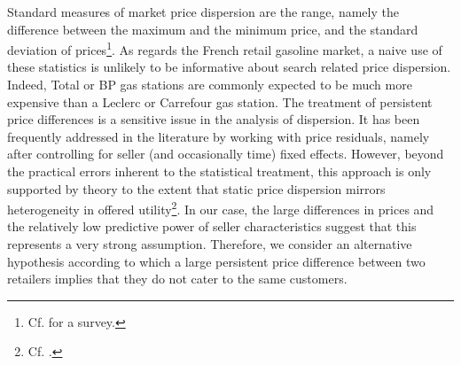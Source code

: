 \documentclass[english]{article}
\begin{document}
Standard measures of market price dispersion are the range, namely the difference between the maximum and the minimum price, and the standard deviation of prices\footnote{Cf. \cite{BAY06} for a survey.}. As regards the French retail gasoline market, a naive use of these statistics is unlikely to be informative about search related price dispersion. Indeed, Total or BP gas stations are commonly expected to be much more expensive than a Leclerc or Carrefour gas station. The treatment of persistent price differences is a sensitive issue in the analysis of dispersion. It has been frequently addressed in the literature by working with price residuals, namely after controlling for seller (and occasionally time) fixed effects. However, beyond the practical errors inherent to the statistical treatment, this approach is only supported by theory to the extent that static price dispersion mirrors heterogeneity in offered utility\footnote{Cf. \cite{WIL11}.}. In our case, the large differences in prices and the relatively low predictive power of seller characteristics suggest that this represents a very strong assumption. Therefore, we consider an alternative hypothesis according to which a large persistent price difference between two retailers implies that they do not cater to the same customers. 
\end{document}
